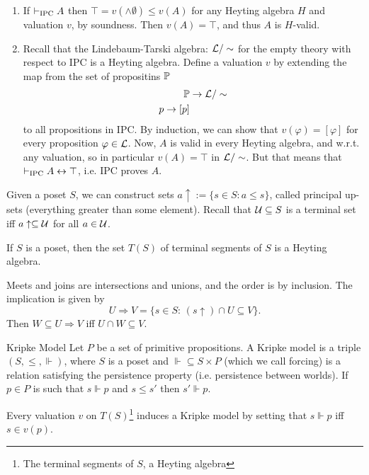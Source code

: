 \documentclass{article}
\numberwithin{thm}{subsection}
\begin{document}
\proof \hspace{0.1cm} \begin{enumerate}
    \item[$(\Rightarrow)$] If $\vdash_{\text{IPC}}A$ then $\top = v(\wedge \emptyset) \leq v(A)$ for any Heyting algebra $H$ and valuation $v$, by soundness. Then $v(A) = \top$, and thus $A$ is $H$-valid.
    \item[$(\Leftarrow)$] Recall that the Lindebaum-Tarski algebra: $\mathcal{L} / \sim$ for the empty theory with respect to IPC is a Heyting algebra. Define a valuation $v$ by extending the map from the set of propositins $\mathbb{P}$ \begin{align*}
        \mathbb{P} &\to \mathcal{L}/ \sim \\
        p \to [p]\\
    \end{align*}
    to all propositions in IPC. By induction, we can show that $v(\varphi) = [\varphi]$ for every proposition $\varphi \in \mathcal{L}$. Now, $A$ is valid in every Heyting algebra, and w.r.t. any valuation, so in particular $v(A) = \top$ in $\mathcal{L} / \sim$. But that means that $\vdash_{\text{IPC}} A \leftrightarrow \top$, i.e. IPC proves $A$.
\end{enumerate}
\endproof
Given a poset $S$, we can construct sets $a\uparrow := \{ s \in S : a \leq s\}$, called principal up-sets (everything greater than some element). Recall that $\mathcal{U} \subseteq S$ is a terminal set iff $a \uparrow \subseteq \mathcal{U}$ for all $a \in \mathcal{U}$.
\begin{fancyprop}{}
    If $S$ is a poset, then the set $T(S)$ of terminal segments of $S$ is a Heyting algebra.
\end{fancyprop}
\proof Meets and joins are intersections and unions, and the order is by inclusion. The implication is given by \[ U \Rightarrow V = \{ s \in S: \, (s \uparrow) \cap U \subseteq V\}. \]
Then $W \subseteq U \Rightarrow V$ iff $U \cap W \subseteq V$.
\begin{fancydefine}{Kripke Model}
    Let $P$ be a set of primitive propositions. A Kripke model is a triple $(S, \leq, \Vdash)$, where $S$ is a poset and $\Vdash \subseteq S \times P$ (which we call forcing) is a relation satisfying the persistence property (i.e. persistence between worlds). If $p \in P$ is such that $s \Vdash p$ and $s \leq s'$ then $s' \Vdash p$.
\end{fancydefine} 
Every valuation $v$ on $T(S)$\footnote{The terminal segments of $S$, a Heyting algebra} induces a Kripke model by setting that $s \Vdash p$ iff $s \in v(p)$.
\end{document}
